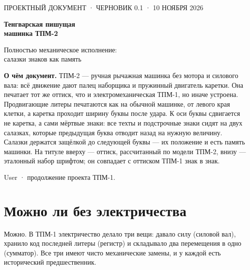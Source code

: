 


\begin{titlepage}
\vspace*{18mm}
{\sffamily\small ПРОЕКТНЫЙ ДОКУМЕНТ · ЧЕРНОВИК 0.1 · 10 НОЯБРЯ 2026}\par
\vspace{8mm}
{\sffamily\bfseries\fontsize{26}{30}\selectfont Тенгварская пишущая\\[2pt] машинка ТПМ-2}\par
\vspace{4mm}
{\large Полностью механическое исполнение:\\ салазки знаков как память}\par
\vspace{14mm}
\begin{center}
\setlength\tgem{13.5mm}
\begin{tikzpicture}[x=\tgu,y=\tgu]

\end{tikzpicture}
\end{center}
\vspace{6mm}
\noindent\begin{minipage}{0.86\textwidth}\small
\textbf{О чём документ.} ТПМ-2 — ручная рычажная машинка без мотора и силового вала: всё движение дают палец наборщика и пружинный двигатель каретки. Она печатает тот же оттиск, что и электромеханическая ТПМ-1, но иначе устроена. Продвигающие литеры печатаются как на обычной машинке, от левого края клетки, а каретка проходит ширину буквы после удара. К оси буквы сдвигается не каретка, а сами мёртвые знаки: все техты и подстрочные знаки сидят на двух салазках, которые предыдущая буква отводит назад на нужную величину. Салазки держатся защёлкой до следующей буквы — их положение и есть память машинки. На титуле вверху — оттиск, рассчитанный по модели ТПМ-2, внизу — эталонный набор шрифтом; он совпадает с оттиском ТПМ-1 знак в знак.
\end{minipage}
\vfill
{\small User · продолжение проекта ТПМ-1.}
\end{titlepage}

\tableofcontents
\newpage

\section{Можно ли без электричества}

Можно. В ТПМ-1 электричество делало три вещи: давало силу (силовой вал), хранило код последней литеры (регистр) и складывало два перемещения в одно (сумматор). Все три имеют чисто механические замены, и у каждой есть исторический предшественник.

